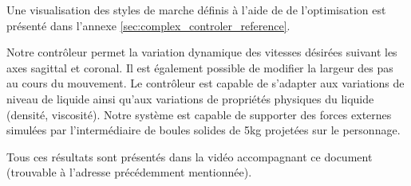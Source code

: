 \documentclass[runningheads,a4paper]{llncs}
\begin{document}
Une visualisation des styles de marche définis à l'aide de de l'optimisation est présenté dans l'annexe \ref{sec:complex_controler_reference}. 

Notre contrôleur permet la variation dynamique des vitesses désirées suivant les axes sagittal et coronal. Il est également possible de modifier la largeur des pas au cours du mouvement.
Le contrôleur est capable de s'adapter aux variations de niveau de liquide ainsi qu'aux variations de propriétés physiques du liquide (densité, viscosité). Notre système est capable de supporter des forces externes simulées par l'intermédiaire de boules solides de 5kg projetées sur le personnage.

Tous ces résultats sont présentés dans la vidéo accompagnant ce document (trouvable à l'adresse précédemment mentionnée). 
\end{document}

